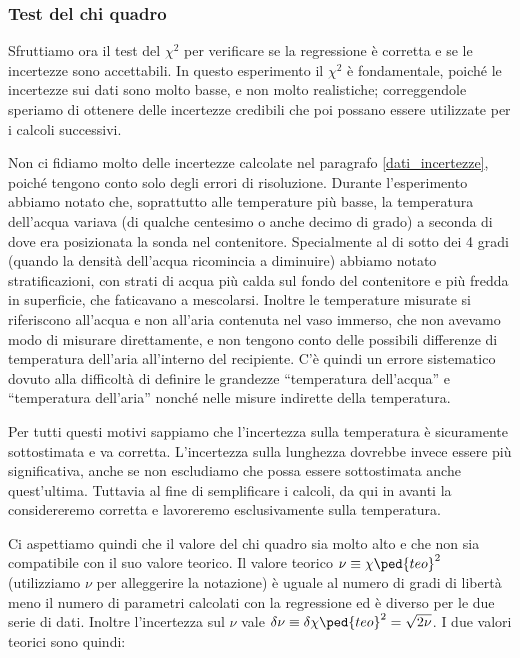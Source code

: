 \subsubsection{Test del chi quadro}
\label{chi_1}

Sfruttiamo ora il test del $\chi^2$ per verificare se la regressione è corretta e se le incertezze sono accettabili.
In questo esperimento il $\chi^2$ è fondamentale, poiché le incertezze sui dati sono molto basse, e non molto realistiche;
correggendole speriamo di ottenere delle incertezze credibili che poi possano essere utilizzate per i calcoli successivi.

Non ci fidiamo molto delle incertezze calcolate nel paragrafo \ref{dati_incertezze}, poiché tengono conto solo degli errori
di risoluzione. Durante l'esperimento abbiamo notato che, soprattutto alle temperature più basse, la temperatura dell'acqua
variava (di qualche centesimo o anche decimo di grado) a seconda di dove era posizionata la sonda nel contenitore. Specialmente
al di sotto dei 4 gradi (quando la densità dell'acqua ricomincia a diminuire) abbiamo notato stratificazioni, con strati di acqua
più calda sul fondo del contenitore e più fredda in superficie, che faticavano a mescolarsi. Inoltre le temperature misurate
si riferiscono all'acqua e non all'aria contenuta nel vaso immerso, che non avevamo modo di misurare direttamente,
e non tengono conto delle possibili differenze di temperatura dell'aria all'interno del recipiente.
C'è quindi un errore sistematico dovuto alla difficoltà di definire le grandezze ``temperatura dell'acqua'' e ``temperatura dell'aria''
nonché nelle misure indirette della temperatura. 

Per tutti questi motivi sappiamo che
l'incertezza sulla temperatura è sicuramente sottostimata e va corretta. L'incertezza sulla lunghezza dovrebbe invece
essere più significativa, anche se non escludiamo che possa essere sottostimata anche quest'ultima. Tuttavia
al fine di semplificare i calcoli, da qui in avanti la
considereremo corretta e lavoreremo esclusivamente sulla temperatura.

Ci aspettiamo quindi che il valore del chi quadro sia molto alto e che non sia compatibile con il suo valore teorico. Il valore teorico
$\nu \equiv \chi\ped{teo}^2$ (utilizziamo $\nu$ per alleggerire la notazione) è uguale al numero di gradi di libertà meno
il numero di parametri calcolati con la regressione ed è diverso per le due serie di dati. Inoltre l'incertezza sul
$\nu$ vale $\delta \nu \equiv \delta \chi\ped{teo}^2 = \sqrt{2\nu}$. I due valori teorici sono quindi:

